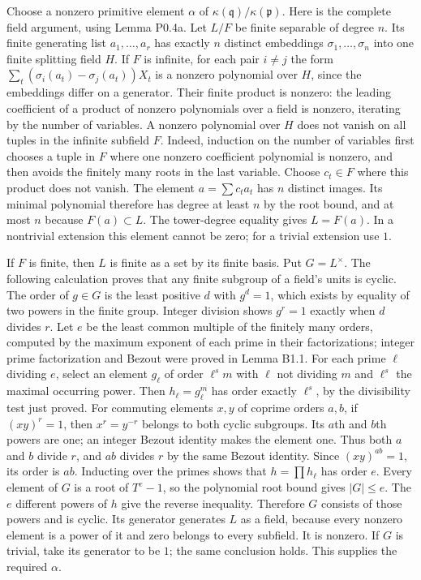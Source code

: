 \documentclass[11pt,a4paper,openany]{report}
\begin{document}
Choose a nonzero primitive element \(\alpha\) of \(\kappa(\mathfrak q)/\kappa(\mathfrak p)\). Here is the complete field argument, using Lemma P0.4a. Let \(L/F\) be finite separable of degree \(n\). Its finite generating list \(a_1,\ldots,a_r\) has exactly \(n\) distinct embeddings \(\sigma_1,\ldots,\sigma_n\) into one finite splitting field \(H\). If \(F\) is infinite, for each pair \(i\ne j\) the form \(\sum_t(\sigma_i(a_t)-\sigma_j(a_t))X_t\) is a nonzero polynomial over \(H\), since the embeddings differ on a generator. Their finite product is nonzero: the leading coefficient of a product of nonzero polynomials over a field is nonzero, iterating by the number of variables. A nonzero polynomial over \(H\) does not vanish on all tuples in the infinite subfield \(F\). Indeed, induction on the number of variables first chooses a tuple in \(F\) where one nonzero coefficient polynomial is nonzero, and then avoids the finitely many roots in the last variable. Choose \(c_t\in F\) where this product does not vanish. The element \(a=\sum c_ta_t\) has \(n\) distinct images. Its minimal polynomial therefore has degree at least \(n\) by the root bound, and at most \(n\) because \(F(a)\subset L\). The tower-degree equality gives \(L=F(a)\). In a nontrivial extension this element cannot be zero; for a trivial extension use \(1\).

If \(F\) is finite, then \(L\) is finite as a set by its finite basis. Put \(G=L^\times\). The following calculation proves that any finite subgroup of a field's units is cyclic. The order of \(g\in G\) is the least positive \(d\) with \(g^d=1\), which exists by equality of two powers in the finite group. Integer division shows \(g^r=1\) exactly when \(d\) divides \(r\). Let \(e\) be the least common multiple of the finitely many orders, computed by the maximum exponent of each prime in their factorizations; integer prime factorization and Bezout were proved in Lemma B1.1. For each prime \(\ell\) dividing \(e\), select an element \(g_\ell\) of order \(\ell^s m\) with \(\ell\) not dividing \(m\) and \(\ell^s\) the maximal occurring power. Then \(h_\ell=g_\ell^m\) has order exactly \(\ell^s\), by the divisibility test just proved. For commuting elements \(x,y\) of coprime orders \(a,b\), if \((xy)^r=1\), then \(x^r=y^{-r}\) belongs to both cyclic subgroups. Its \(a\)th and \(b\)th powers are one; an integer Bezout identity makes the element one. Thus both \(a\) and \(b\) divide \(r\), and \(ab\) divides \(r\) by the same Bezout identity. Since \((xy)^{ab}=1\), its order is \(ab\). Inducting over the primes shows that \(h=\prod h_\ell\) has order \(e\). Every element of \(G\) is a root of \(T^e-1\), so the polynomial root bound gives \(|G|\le e\). The \(e\) different powers of \(h\) give the reverse inequality. Therefore \(G\) consists of those powers and is cyclic. Its generator generates \(L\) as a field, because every nonzero element is a power of it and zero belongs to every subfield. It is nonzero. If \(G\) is trivial, take its generator to be \(1\); the same conclusion holds. This supplies the required \(\alpha\).
\end{document}
